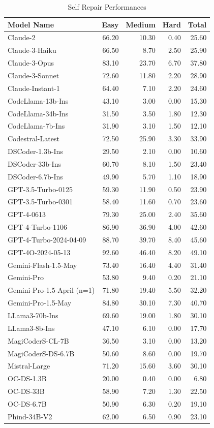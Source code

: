 \begin{table}[ht]
\centering
\begin{tabular}{lrrrr}
    \hline
Model Name & Easy & Medium & Hard & Total \\
    \hline
Claude-2 & 66.20& 10.30& 0.40& 25.60\\
Claude-3-Haiku & 66.50& 8.70& 2.50& 25.90\\
Claude-3-Opus & 83.10& 23.70& 6.70& 37.80\\
Claude-3-Sonnet & 72.60& 11.80& 2.20& 28.90\\
Claude-Instant-1 & 64.40& 7.10& 2.20& 24.60\\
CodeLlama-13b-Ins & 43.10& 3.00& 0.00& 15.30\\
CodeLlama-34b-Ins & 31.50& 3.50& 1.80& 12.30\\
CodeLlama-7b-Ins & 31.90& 3.10& 1.50& 12.10\\
Codestral-Latest & 72.50& 25.90& 3.30& 33.90\\
DSCoder-1.3b-Ins & 29.50& 2.10& 0.00& 10.60\\
DSCoder-33b-Ins & 60.70& 8.10& 1.50& 23.40\\
DSCoder-6.7b-Ins & 49.90& 5.70& 1.10& 18.90\\
GPT-3.5-Turbo-0125 & 59.30& 11.90& 0.50& 23.90\\
GPT-3.5-Turbo-0301 & 58.40& 11.60& 0.70& 23.60\\
GPT-4-0613 & 79.30& 25.00& 2.40& 35.60\\
GPT-4-Turbo-1106 & 86.90& 36.90& 4.00& 42.60\\
GPT-4-Turbo-2024-04-09 & 88.70& 39.70& 8.40& 45.60\\
GPT-4O-2024-05-13 & 92.60& 46.40& 8.20& 49.10\\
Gemini-Flash-1.5-May & 73.40& 16.40& 4.40& 31.40\\
Gemini-Pro & 53.80& 9.40& 0.20& 21.10\\
Gemini-Pro-1.5-April (n=1) & 71.80& 19.40& 5.50& 32.20\\
Gemini-Pro-1.5-May & 84.80& 30.10& 7.30& 40.70\\
LLama3-70b-Ins & 69.60& 19.00& 1.80& 30.10\\
LLama3-8b-Ins & 47.10& 6.10& 0.00& 17.70\\
MagiCoderS-CL-7B & 36.50& 3.10& 0.00& 13.20\\
MagiCoderS-DS-6.7B & 50.60& 8.60& 0.00& 19.70\\
Mistral-Large & 71.20& 15.60& 3.60& 30.10\\
OC-DS-1.3B & 20.00& 0.40& 0.00& 6.80\\
OC-DS-33B & 58.90& 7.20& 1.30& 22.50\\
OC-DS-6.7B & 50.90& 6.30& 0.20& 19.10\\
Phind-34B-V2 & 62.00& 6.50& 0.90& 23.10\\
    \hline
\end{tabular}
\caption{Self Repair Performances}
\end{table}

